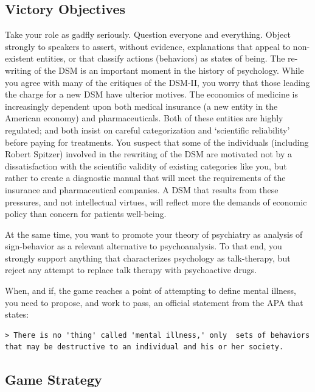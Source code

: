\begin{refsection}
\section{Victory Objectives}
\label{victoryobjectives}

Take your role as gadfly seriously. Question everyone and everything. Object strongly to speakers to assert, without evidence, explanations that appeal to non-existent entities, or that classify actions (behaviors) as states of being.
The re-writing of the DSM is an important moment in the history of psychology. While you agree with many of the critiques of the DSM-II, you worry that those leading the charge for a new DSM have ulterior motives. The economics of medicine is increasingly dependent upon both medical insurance (a new entity in the American economy) and pharmaceuticals. Both of these entities are highly regulated; and both insist on careful categorization and `scientific reliability' before paying for treatments. You suspect that some of the individuals (including Robert Spitzer) involved in the rewriting of the DSM are motivated not by a dissatisfaction with the scientific validity of existing categories like you, but rather to create a diagnostic manual that will meet the requirements of the insurance and pharmaceutical companies. A DSM that results from these pressures, and not intellectual virtues, will reflect more the demands of economic policy than concern for patients well-being.

At the same time, you want to promote your theory of psychiatry as analysis of sign-behavior as a relevant alternative to psychoanalysis. To that end, you strongly support anything that characterizes psychology as talk-therapy, but reject any attempt to replace talk therapy with psychoactive drugs.

When, and if, the game reaches a point of attempting to define mental illness, you need to propose, and work to pass, an official statement from the APA that states:

\begin{verbatim}
> There is no 'thing' called 'mental illness,' only  sets of behaviors that may be destructive to an individual and his or her society.
\end{verbatim}

\subsection{Game Strategy}
\label{gamestrategy}


\end{refsection}
